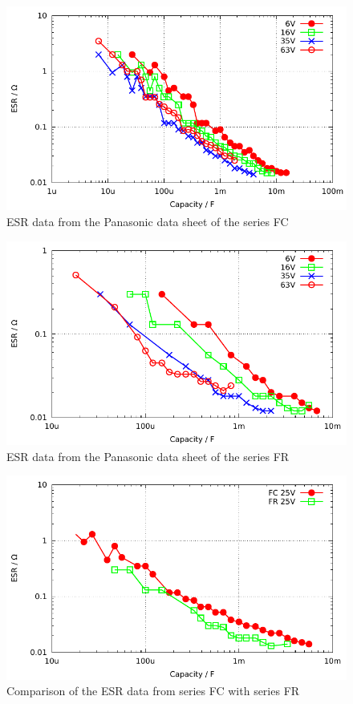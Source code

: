 \begin{figure}[H]
  \centering
    \includegraphics[width=14cm]{../GNU/Cap_FC_data.pdf}
  \caption{ESR data from the Panasonic data sheet of the series FC}
  \label{fig:Cap_FC_data}
\end{figure}

\begin{figure}[H]
  \centering
    \includegraphics[width=14cm]{../GNU/Cap_FR_data.pdf}
  \caption{ESR data from the Panasonic data sheet of the series FR}
  \label{fig:Cap_FR_data}
\end{figure}

\begin{figure}[H]
  \centering
    \includegraphics[width=14cm]{../GNU/Cap_FC_FR_data.pdf}
  \caption{Comparison of the ESR data from series FC with series FR}
  \label{fig:Cap_FC_FR_data}
\end{figure}

